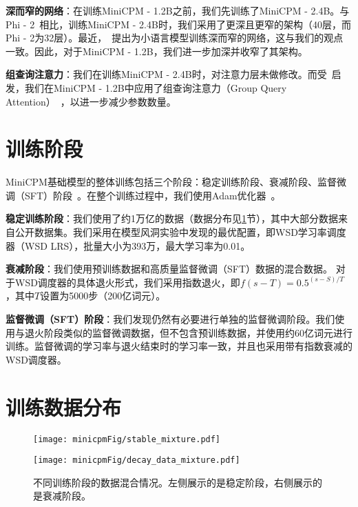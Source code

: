 \noindent\textbf{深而窄的网络}：在训练MiniCPM - 1.2B之前，我们先训练了MiniCPM - 2.4B。与Phi - 2~\citep{Javaheripi2023Phi2}相比，训练MiniCPM - 2.4B时，我们采用了更深且更窄的架构（40层，而Phi - 2为32层）。最近，~\cite{liu2024mobilellm}提出为小语言模型训练深而窄的网络，这与我们的观点一致。因此，对于MiniCPM - 1.2B，我们进一步加深并收窄了其架构。 

\noindent\textbf{组查询注意力}：我们在训练MiniCPM - 2.4B时，对注意力层未做修改。而受~\cite{liu2024mobilellm}启发，我们在MiniCPM - 1.2B中应用了组查询注意力（Group Query Attention）~\citep{ainslie-etal-2023-gqa}，以进一步减少参数数量。

\section{训练阶段}
MiniCPM基础模型的整体训练包括三个阶段：稳定训练阶段、衰减阶段、监督微调（SFT）阶段~\citep{zhang2023instruction,wei2021finetuned}。在整个训练过程中，我们使用Adam优化器~\citep{kingma2014adam}。 

\textbf{稳定训练阶段}：我们使用了约1万亿的数据（数据分布见\ref{fig:appdatamixture}节），其中大部分数据来自公开数据集。我们采用在模型风洞实验中发现的最优配置，即WSD学习率调度器（WSD LRS），批量大小为393万，最大学习率为0.01。

\textbf{衰减阶段}：我们使用预训练数据和高质量监督微调（SFT）数据的混合数据。
对于WSD调度器的具体退火形式，我们采用指数退火，即$f(s - T)=  0.5^{(s - S)/T}$，其中$T$设置为5000步（200亿词元）。

\textbf{监督微调（SFT）阶段}：我们发现仍然有必要进行单独的监督微调阶段。我们使用与退火阶段类似的监督微调数据，但不包含预训练数据，并使用约60亿词元进行训练。监督微调的学习率与退火结束时的学习率一致，并且也采用带有指数衰减的WSD调度器。 





\section{训练数据分布}
\label{sec:appdatadistrbution}

\begin{figure}[htbp]
    \centering
    \begin{minipage}{0.48\linewidth}
        \centering
        \texttt{[image: minicpmFig/stable\_mixture.pdf]}
    \end{minipage}
    \hfill 
    \begin{minipage}{0.48\linewidth}
        \centering
        \texttt{[image: minicpmFig/decay\_data\_mixture.pdf]}
    \end{minipage}
    \caption{不同训练阶段的数据混合情况。左侧展示的是稳定阶段，右侧展示的是衰减阶段。}
        \label{fig:appdatamixture}
\end{figure}

